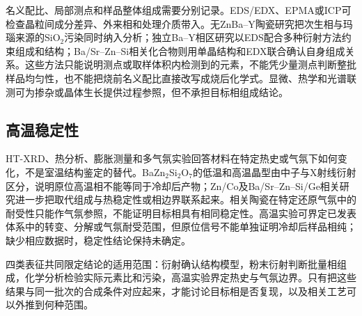 名义配比、局部测点和样品整体组成需要分别记录。EDS/EDX、EPMA或ICP可检查晶粒间成分差异、外来相和处理介质带入。无ZnBa--Y陶瓷研究把次生相与玛瑙来源的$\mathrm{SiO_2}$污染同时纳入分析\cite{yamane2024microstructure}；独立Ba--Y相区研究以EDS配合多种衍射方法约束组成和结构\cite{gulay2024navigation}；Ba/Sr--Zn--Si相关化合物则用单晶结构和EDX联合确认自身组成关系\cite{thieme2015ba1}。这些方法只能说明测点或取样体积内检测到的元素，不能凭少量测点判断整批样品均匀性，也不能把烧前名义配比直接改写成烧后化学式。显微、热学和光谱联测可为掺杂或晶体生长提供过程参照，但不承担目标相组成结论\cite{tejas2024structural,pang2005study}。

\subsection{高温稳定性}

HT-XRD、热分析、膨胀测量和多气氛实验回答材料在特定热史或气氛下如何变化，不是室温结构鉴定的替代。BaZn$_2$Si$_2$O$_7$的低温和高温晶型由中子与X射线衍射区分，说明原位高温相不能等同于冷却后产物\cite{lin1999phase}；Zn/Co及Ba/Sr--Zn--Si/Ge相关研究进一步把取代组成与热稳定性或相边界联系起来\cite{kerstan2013bazn2si2o7,thieme2016negative}。相关陶瓷在特定还原气氛中的耐受性只能作气氛参照，不能证明目标相具有相同稳定性\cite{zou2019anti}。高温实验可界定已发表体系中的转变、分解或气氛耐受范围，但原位信号不能单独证明冷却后样品相纯；缺少相应数据时，稳定性结论保持未确定。

四类表征共同限定结论的适用范围：衍射确认结构模型，粉末衍射判断批量相组成，化学分析检验实际元素比和污染，高温实验界定热史与气氛边界。只有把这些结果与同一批次的合成条件对应起来，才能讨论目标相是否复现，以及相关工艺可以外推到何种范围。
